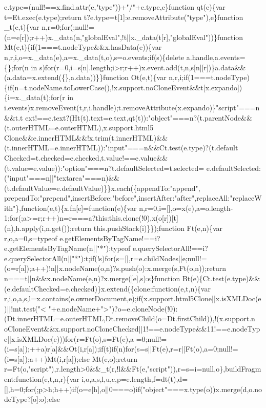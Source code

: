 \begin{DoxyCode}
{       e.type=(null!==x.find.attr(e,"type"))+"/"+e.type,e\}function qt(e)\{var t=Et.exec(e.type);return t?e.type=t[1]:e.removeAttribute("type"),e\}function \_t(e,t)\{var
       n,r=0;for(;null!=(n=e[r]);r++)x.\_data(n,"globalEval",!t||x.\_data(t[r],"globalEval"))\}function
       Mt(e,t)\{if(1===t.nodeType&&x.hasData(e))\{var n,r,i,o=x.\_data(e),a=x.\_data(t,o),s=o.events;if(s)\{delete
       a.handle,a.events=\{\};for(n in
       s)for(r=0,i=s[n].length;i>r;r++)x.event.add(t,n,s[n][r])\}a.data&&(a.data=x.extend(\{\},a.data))\}\}function Ot(e,t)\{var
       n,r,i;if(1===t.nodeType)\{if(n=t.nodeName.toLowerCase(),!x.support.noCloneEvent&&t[x.expando])\{i=x.\_data(t);for(r in
       i.events)x.removeEvent(t,r,i.handle);t.removeAttribute(x.expando)\}"script"===n&&t.t
      ext!==e.text?(Ht(t).text=e.text,qt(t)):"object"===n?(t.parentNode&&(t.outerHTML=e.outerHTML),x.support.html5
      Clone&&e.innerHTML&&!x.trim(t.innerHTML)&&(t.innerHTML=e.innerHTML)):"input"===n&&Ct.test(e.type)?(t.default
      Checked=t.checked=e.checked,t.value!==e.value&&(t.value=e.value)):"option"===n?t.defaultSelected=t.selected=
      e.defaultSelected:("input"===n||"textarea"===n)&&(t.defaultValue=e.defaultValue)\}\}x.each(\{appendTo:"append",
      prependTo:"prepend",insertBefore:"before",insertAfter:"after",replaceAll:"replaceWith"\},function(e,t)\{x.fn[e]=function(e)\{var
       n,r=0,i=[],o=x(e),a=o.length-1;for(;a>=r;r++)n=r===a?this:this.clone(!0),x(o[r])[t](n),h.apply(i,n.get());return this.pushStack(i)\}\});function Ft(e,n)\{var r,o,a=0,s=typeof
       e.getElementsByTagName!==i?e.getElementsByTagName(n||"*"):typeof
       e.querySelectorAll!==i?e.querySelectorAll(n||"*"):t;if(!s)for(s=[],r=e.childNodes||e;null!=(o=r[a]);a++)!n||x.nodeName(o,n)?s.push(o):x.merge(s,Ft(o,n));return
       n===t||n&&x.nodeName(e,n)?x.merge([e],s):s\}function
       Bt(e)\{Ct.test(e.type)&&(e.defaultChecked=e.checked)\}x.extend(\{clone:function(e,t,n)\{var
       r,i,o,a,s,l=x.contains(e.ownerDocument,e);if(x.support.html5Clone||x.isXMLDoc(e)||!mt.test("<
      "+e.nodeName+">")?o=e.cloneNode(!0):(Dt.innerHTML=e.outerHTML,Dt.removeChild(o=Dt.firstChild)),!(x.support.n
      oCloneEvent&&x.support.noCloneChecked||1!==e.nodeType&&11!==e.nodeType||x.isXMLDoc(e)))for(r=Ft(o),s=Ft(e),a
      =0;null!=(i=s[a]);++a)r[a]&&Ot(i,r[a]);if(t)if(n)for(s=s||Ft(e),r=r||Ft(o),a=0;null!=(i=s[a]);a++)Mt(i,r[a]);else Mt(e,o);return
       r=Ft(o,"script"),r.length>0&&\_t(r,!l&&Ft(e,"script")),r=s=i=null,o\},buildFragment:function(e,t,n,r)\{var
       i,o,a,s,l,u,c,p=e.length,f=dt(t),d=[],h=0;for(;p>h;h++)if(o=e[h],o||0===o)if("object"===x.type(o))x.merge(d,o.nodeType?[o]:o);else
}
\end{DoxyCode}
